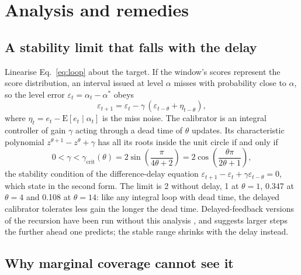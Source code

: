 \section{Analysis and remedies}\label{sec:analysis}

\subsection{A stability limit that falls with the delay}\label{sec:analysis:p1}

Linearise Eq.~\eqref{eq:loop} about the target. If the window's scores represent the score
distribution, an interval issued at level $\alpha$ misses with probability close to $\alpha$, so
the level error $\varepsilon_t = \alpha_t - \alpha^\ast$ obeys
\begin{equation}
  \varepsilon_{t+1} = \varepsilon_t - \gamma\,(\varepsilon_{t-\theta} + \eta_{t-\theta}),
  \label{eq:linear}
\end{equation}
where $\eta_t = e_t - \mathrm{E}[e_t \mid \alpha_t]$ is the miss noise. The calibrator is an
integral controller of gain $\gamma$ acting through a dead time of $\theta$ updates. Its
characteristic polynomial $z^{\theta+1} - z^{\theta} + \gamma$ has all its roots inside the unit
circle if and only if
\begin{equation}
  0 < \gamma < \gamma_{\mathrm{crit}}(\theta) = 2\sin\!\left(\frac{\pi}{4\theta+2}\right)
  = 2\cos\!\left(\frac{\theta\pi}{2\theta+1}\right),
  \label{eq:gammacrit}
\end{equation}
the stability condition of the difference-delay equation
$\varepsilon_{t+1} - \varepsilon_t + \gamma\varepsilon_{t-\theta} = 0$, which \citet{levin1976} state
in the second form. The limit is 2 without delay, 1 at $\theta = 1$, 0.347 at $\theta = 4$ and
0.108 at $\theta = 14$: like any integral loop with dead time, the delayed calibrator tolerates
less gain the longer the dead time. Delayed-feedback versions of the recursion have been run
without this analysis \citep{dixit2023,szabadvary2024}, and \citet{szabadvary2024} suggests
larger steps the further ahead one predicts; the stable range shrinks with the delay instead.

\subsection{Why marginal coverage cannot see it}\label{sec:analysis:p2}

